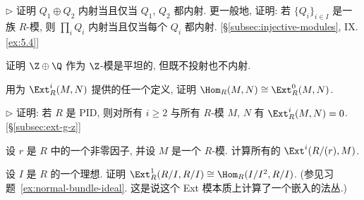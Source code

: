 \begin{prob}\label{ex:product-injective}
$\triangleright$ 证明 $Q_1\oplus Q_2$ 内射当且仅当 $Q_1$, $Q_2$ 都内射. 更一般地, 证明: 若 $\{Q_i\}_{i\in I}$ 是一族 $R$-模, 则 $\prod_i Q_i$ 内射当且仅当每个 $Q_i$ 都内射. [\S\ref{subsec:injective-modules}, IX.\ref{ex:5.4}]
\end{prob}

\begin{prob}\label{ex:Z-plus-Q}
证明 $\Z\oplus\Q$ 作为 $\Z$-模是平坦的, 但既不投射也不内射.
\end{prob}

\begin{prob}\label{ex:ext0-hom}
用为 $\Ext_R^i(M,N)$ 提供的任一个定义, 证明 $\Hom_R(M,N)\cong\Ext_R^0(M,N)$.
\end{prob}

\begin{prob}\label{ex:pid-ext-vanish}
$\triangleright$ 证明: 若 $R$ 是 PID, 则对所有 $i\ge 2$ 与所有 $R$-模 $M$, $N$ 有 $\Ext_R^i(M,N)=0$. [\S\ref{subsec:ext-g-z}]
\end{prob}

\begin{prob}\label{ex:ext-nonzero-divisor}
设 $r$ 是 $R$ 中的一个非零因子, 并设 $M$ 是一个 $R$-模. 计算所有的 $\Ext^i(R/(r),M)$.
\end{prob}

\begin{prob}\label{ex:ext-normal-bundle}
设 $I$ 是 $R$ 的一个理想. 证明 $\Ext_R^1(R/I,R/I)\cong\Hom_R(I/I^2,R/I)$. (参见习题~\ref{ex:normal-bundle-ideal}. 这是说这个 Ext 模本质上计算了一个嵌入的法丛.)
\end{prob}

